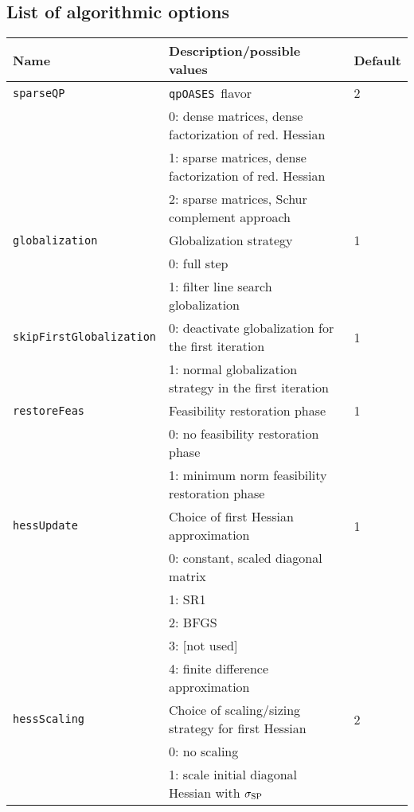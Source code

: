 \documentclass[	11pt,
				a4paper,
				abstract=true,
				twoside=true,
				bibliography=totoc, 
				headinclude=true,
				footinclude=false]{scrartcl}
\newcommand{\qpOASES}{\texttt{qpOASES}}
\begin{document}
\subsection{List of algorithmic options}
\begin{longtable}[c]{lll}
Name 							& Description/possible values									& Default	\\\hline\hline
%
\texttt{sparseQP}				& \qpOASES\ flavor												& 2			\\
								& 0: dense matrices, dense factorization of red. Hessian		&			\\
								& 1: sparse matrices, dense factorization of red. Hessian		&			\\
								& 2: sparse matrices, Schur complement approach					&			\\\hline
%
\texttt{globalization}			& Globalization strategy										& 1			\\
								& 0: full step 													&			\\
								& 1: filter line search globalization							&			\\\hline
%
\texttt{skipFirstGlobalization}	& 0: deactivate globalization for the first iteration			& 1			\\
								& 1: normal globalization strategy in the first iteration		&			\\\hline
%
\texttt{restoreFeas}			& Feasibility restoration phase									& 1			\\
								& 0: no feasibility restoration phase 							&			\\
								& 1: minimum norm feasibility restoration phase					&			\\\hline
%
\texttt{hessUpdate}				& Choice of first Hessian approximation							& 1			\\
								& 0: constant, scaled diagonal matrix							&			\\
								& 1: SR1														&			\\
								& 2: BFGS														&			\\
								& 3: [not used]													&			\\
								& 4: finite difference approximation							&			\\\hline
%
\texttt{hessScaling}			& Choice of scaling/sizing strategy for first Hessian			& 2			\\
								& 0: no scaling													&			\\
								& 1: scale initial diagonal Hessian with $\sigma_{\textup{SP}}$	&			\\

\end{longtable}
\end{document}
